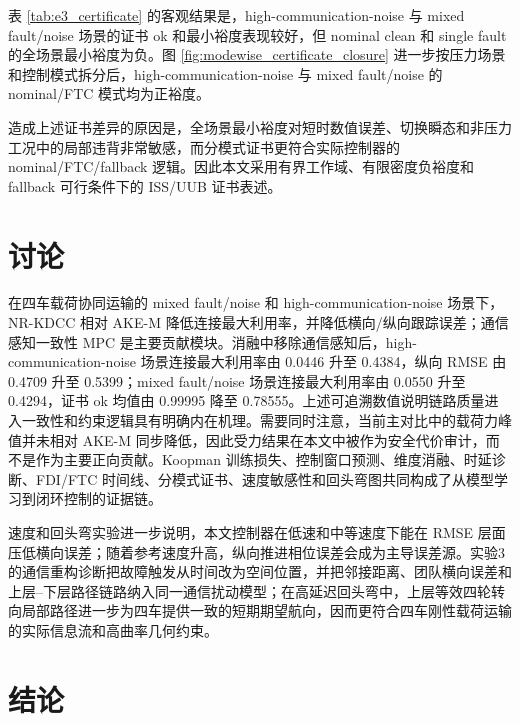 \documentclass[twocolumn,3p,times,procedia]{elsarticle}
\newif\ifNRReview
\newcommand{\reviewblock}[1]{\ifNRReview\par\smallskip\noindent\begingroup\setlength{\fboxsep}{4pt}\colorbox{yellow!35}{\parbox{0.96\linewidth}{\footnotesize\textbf{当前不足：} #1}}\endgroup\par\smallskip\fi}
\newcommand{\AKE}{AKE-M}
\newcommand{\Method}{NR-KDCC}
\begin{document}
表 \ref{tab:e3_certificate} 的客观结果是，high-communication-noise 与 mixed fault/noise 场景的证书 ok 和最小裕度表现较好，但 nominal clean 和 single fault 的全场景最小裕度为负。图 \ref{fig:modewise_certificate_closure} 进一步按压力场景和控制模式拆分后，high-communication-noise 与 mixed fault/noise 的 nominal/FTC 模式均为正裕度。

造成上述证书差异的原因是，全场景最小裕度对短时数值误差、切换瞬态和非压力工况中的局部违背非常敏感，而分模式证书更符合实际控制器的 nominal/FTC/fallback 逻辑。因此本文采用有界工作域、有限密度负裕度和 fallback 可行条件下的 ISS/UUB 证书表述。

\FloatBarrier

\section{讨论}

在四车载荷协同运输的 mixed fault/noise 和 high-communication-noise 场景下，\Method{} 相对 \AKE{} 降低连接最大利用率，并降低横向/纵向跟踪误差；通信感知一致性 MPC 是主要贡献模块。消融中移除通信感知后，high-communication-noise 场景连接最大利用率由 0.0446 升至 0.4384，纵向 RMSE 由 0.4709 升至 0.5399；mixed fault/noise 场景连接最大利用率由 0.0550 升至 0.4294，证书 ok 均值由 0.99995 降至 0.78555。上述可追溯数值说明链路质量进入一致性和约束逻辑具有明确内在机理。需要同时注意，当前主对比中的载荷力峰值并未相对 \AKE{} 同步降低，因此受力结果在本文中被作为安全代价审计，而不是作为主要正向贡献。Koopman 训练损失、控制窗口预测、维度消融、时延诊断、FDI/FTC 时间线、分模式证书、速度敏感性和回头弯图共同构成了从模型学习到闭环控制的证据链。

速度和回头弯实验进一步说明，本文控制器在低速和中等速度下能在 RMSE 层面压低横向误差；随着参考速度升高，纵向推进相位误差会成为主导误差源。实验3的通信重构诊断把故障触发从时间改为空间位置，并把邻接距离、团队横向误差和上层--下层路径链路纳入同一通信扰动模型；在高延迟回头弯中，上层等效四轮转向局部路径进一步为四车提供一致的短期期望航向，因而更符合四车刚性载荷运输的实际信息流和高曲率几何约束。

\reviewblock{投稿前主要缺口包括：严格 AKE-A 复现或强物理/DMPC 基线；delay/dropout dose-response 与 topology recovery；FDI/FTC 多 seed 检测延迟、误报率和切换延迟统计；受力 $F_x,F_y,M_z$ 分量和力平滑权重消融；同初始条件面板已形成 RMSE/峰值改善且高曲率抗扰分支回头弯团队中心峰值低于 0.2 m，但尚未闭合全过程逐点严格优势。}

\section{结论}
\end{document}
